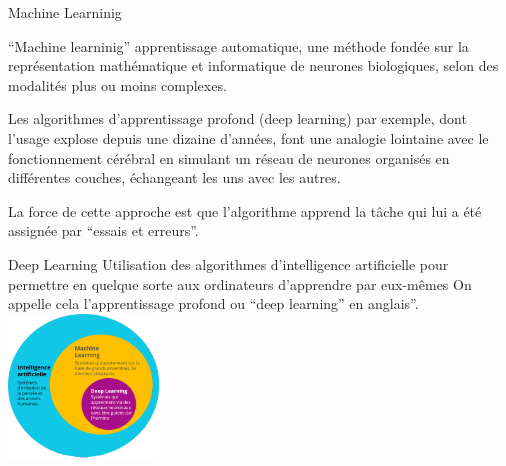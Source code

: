 \begin{frame}{Machine Learninig}
    \begin{itemize}[<+-|alert@+>]
        \myitem
        ``Machine learninig'' apprentissage automatique, une méthode fondée sur
        la représentation mathématique et informatique de neurones
        biologiques, selon des modalités plus ou moins complexes.

        \myitem
        Les algorithmes d'apprentissage profond (deep learning) par exemple, dont
        l'usage explose depuis une dizaine d'années, font une analogie
        lointaine avec le fonctionnement cérébral en simulant un réseau de
        neurones organisés en différentes couches, échangeant les uns avec les
        autres.

        \myitem
        La force de cette approche est que l'algorithme apprend la
        tâche qui lui a été assignée par ``essais et erreurs''.\mybox
    \end{itemize}

    \vspace{80mm}

\end{frame}

\begin{frame}{Deep Learning}
    Utilisation des algorithmes d'intelligence artificielle pour permettre
    en quelque sorte aux ordinateurs d'apprendre par eux-mêmes On
    appelle cela l'apprentissage profond ou ``deep learning'' en anglais''.\mybox
    \\
    \bigskip
    \bigskip
    \centering
    \includegraphics[height=0.3\textwidth,width=0.3\textwidth]{ai1a.png}
\end{frame}

